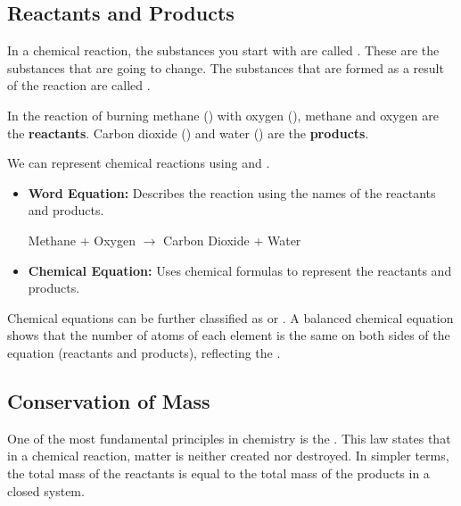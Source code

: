 \subsection{Reactants and Products}

In a chemical reaction, the substances you start with are called . These are the substances that are going to change. The substances that are formed as a result of the reaction are called .

\begin{example}
In the reaction of burning methane () with oxygen (), methane and oxygen are the \textbf{reactants}. Carbon dioxide () and water () are the \textbf{products}.
\end{example}

We can represent chemical reactions using  and .

\begin{itemize}
    \item \textbf{Word Equation:} Describes the reaction using the names of the reactants and products.
    \begin{example}
    Methane + Oxygen $\rightarrow$ Carbon Dioxide + Water
    \end{example}
    \item \textbf{Chemical Equation:} Uses chemical formulas to represent the reactants and products.
    \begin{example}
    \end{example}
\end{itemize}

Chemical equations can be further classified as  or . A balanced chemical equation shows that the number of atoms of each element is the same on both sides of the equation (reactants and products), reflecting the .

\subsection{Conservation of Mass}

One of the most fundamental principles in chemistry is the . This law states that in a chemical reaction, matter is neither created nor destroyed.  In simpler terms, the total mass of the reactants is equal to the total mass of the products in a closed system.

